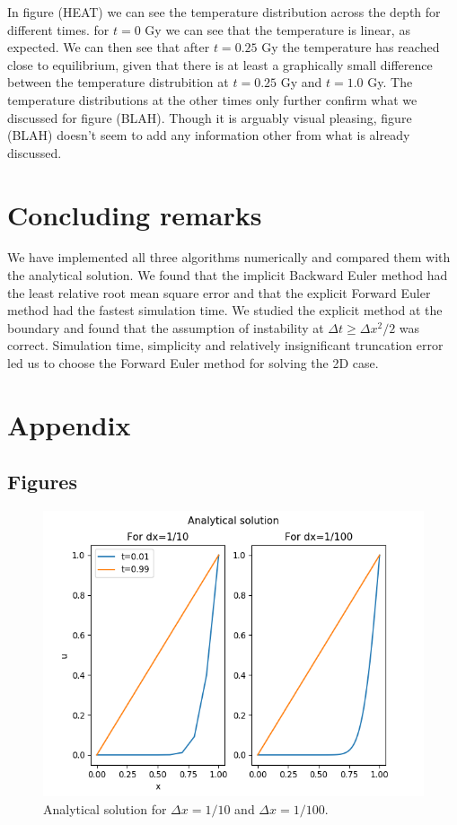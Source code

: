 \documentclass{article}
\begin{document}
\begin{multicols}{2}
In figure (HEAT) we can see the temperature distribution across the depth for different times. for $t=0$ Gy we can see that the temperature is linear, as expected. We can then see that after $t=0.25$ Gy the temperature has reached close to equilibrium, given that there is at least a graphically small difference between the temperature distrubition at $t=0.25$ Gy and $t=1.0$ Gy. The temperature distributions at the other times only further confirm what we discussed for figure (BLAH). Though it is arguably visual pleasing, figure (BLAH) doesn't seem to add any information other from what is already discussed. 

\section{Concluding remarks}

We have implemented all three algorithms numerically and compared them with the analytical solution. We found that the implicit Backward Euler method had the least relative root mean square error and that the explicit Forward Euler method had the fastest simulation time. We studied the explicit method at the boundary and found that the assumption of instability at $\Delta t \geq \Delta x^2/2$ was correct. Simulation time, simplicity and relatively insignificant truncation error led us to choose the Forward Euler method for solving the 2D case. 


\end{multicols}

\clearpage

\appendix %

\section{Appendix}

\subsection{Figures}

\begin{figure}[H]
	\centering
	\includegraphics[width=140mm]{b.png}
	\caption{Analytical solution for $\Delta x = 1/10$ and $\Delta x =1/100$.}
	\label{fig:b}
\end{figure}
\end{document}
